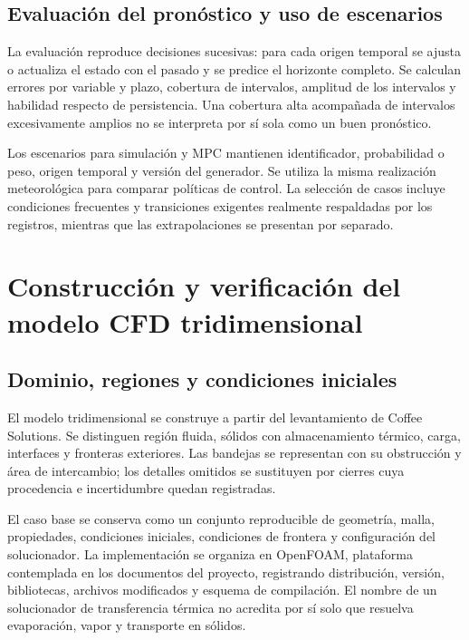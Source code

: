 \subsection{Evaluación del pronóstico y uso de escenarios}

La evaluación reproduce decisiones sucesivas: para cada origen temporal se ajusta o actualiza el estado con el pasado y se predice el horizonte completo. Se calculan errores por variable y plazo, cobertura de intervalos, amplitud de los intervalos y habilidad respecto de persistencia. Una cobertura alta acompañada de intervalos excesivamente amplios no se interpreta por sí sola como un buen pronóstico.

Los escenarios para simulación y MPC mantienen identificador, probabilidad o peso, origen temporal y versión del generador. Se utiliza la misma realización meteorológica para comparar políticas de control. La selección de casos incluye condiciones frecuentes y transiciones exigentes realmente respaldadas por los registros, mientras que las extrapolaciones se presentan por separado.

\section{Construcción y verificación del modelo CFD tridimensional}
\label{met:cfd}

\subsection{Dominio, regiones y condiciones iniciales}

El modelo tridimensional se construye a partir del levantamiento de Coffee Solutions. Se distinguen región fluida, sólidos con almacenamiento térmico, carga, interfaces y fronteras exteriores. Las bandejas se representan con su obstrucción y área de intercambio; los detalles omitidos se sustituyen por cierres cuya procedencia e incertidumbre quedan registradas.

El caso base se conserva como un conjunto reproducible de geometría, malla, propiedades, condiciones iniciales, condiciones de frontera y configuración del solucionador. La implementación se organiza en OpenFOAM, plataforma contemplada en los documentos del proyecto, registrando distribución, versión, bibliotecas, archivos modificados y esquema de compilación. El nombre de un solucionador de transferencia térmica no acredita por sí solo que resuelva evaporación, vapor y transporte en sólidos.

